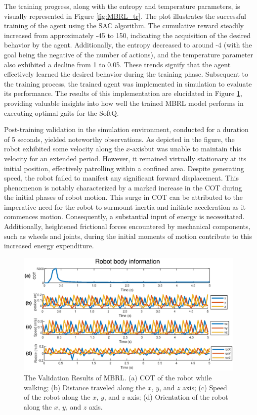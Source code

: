 The training progress, along with the entropy and temperature parameters, is visually represented in Figure \ref{fig:MBRL_tr}. The plot illustrates the successful training of the agent using the SAC algorithm. The cumulative reward steadily increased from approximately -45 to 150, indicating the acquisition of the desired behavior by the agent. Additionally, the entropy decreased to around -4 (with the goal being the negative of the number of actions), and the temperature parameter also exhibited a decline from 1 to 0.05. These trends signify that the agent effectively learned the desired behavior during the training phase. Subsequent to the training process, the trained agent was implemented in simulation to evaluate its performance. The results of this implementation are elucidated in Figure \ref{fig:MBRL_val}, providing valuable insights into how well the trained MBRL model performs in executing optimal gaits for the SoftQ. 

Post-training validation in the simulation environment, conducted for a duration of 5 seconds, yielded noteworthy observations. As depicted in the figure, the robot exhibited some velocity along the $x$-axisbut was unable to maintain this velocity for an extended period. However, it remained virtually stationary at its initial position, effectively patrolling within a confined area. Despite generating speed, the robot failed to manifest any significant forward displacement. This phenomenon is notably characterized by a marked increase in the \ac{COT} during the initial phases of robot motion. This surge in \ac{COT} can be attributed to the imperative need for the robot to surmount inertia and initiate acceleration as it commences motion. Consequently, a substantial input of energy is necessitated. Additionally, heightened frictional forces encountered by mechanical components, such as wheels and joints, during the initial moments of motion contribute to this increased energy expenditure.

\begin{figure}[htb]
    \centering
    \includegraphics[width=\linewidth]{img/chap5/MBRL_val.eps}
    \caption{The Validation Results of MBRL. (a) COT of the robot while walking; (b) Distance traveled along the $x$, $y$, and $z$ axis; (c) Speed of the robot along the $x$, $y$, and $z$ axis; (d) Orientation of the robot along the $x$, $y$, and $z$ axis.}
    \label{fig:MBRL_val}
\end{figure}

